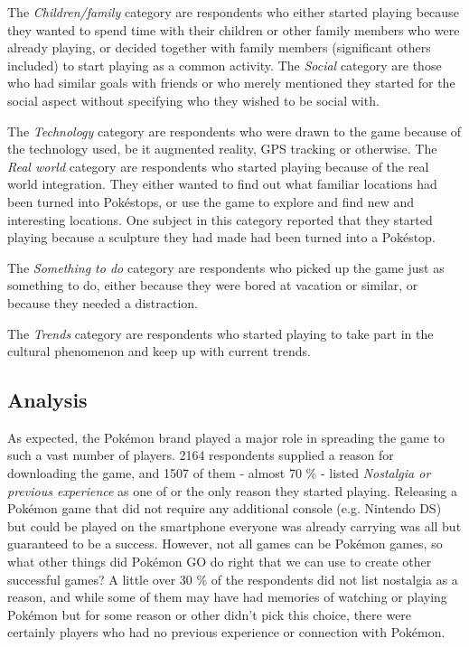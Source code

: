 The \emph{Children/family} category are respondents who either started playing because they wanted to spend time with their children or other family members who were already playing, or decided together with family members (significant others included) to start playing as a common activity. The \emph{Social} category are those who had similar goals with friends or who merely mentioned they started for the social aspect without specifying who they wished to be social with.

The \emph{Technology} category are respondents who were drawn to the game because of the technology used, be it augmented reality, GPS tracking or otherwise. The \emph{Real world} category are respondents who started playing because of the real world integration. They either wanted to find out what familiar locations had been turned into Pokéstops, or use the game to explore and find new and interesting locations. One subject in this category reported that they started playing because a sculpture they had made had been turned into a Pokéstop.

The \emph{Something to do} category are respondents who picked up the game just as something to do, either because they were bored at vacation or similar, or because they needed a distraction.

The \emph{Trends} category are respondents who started playing to take part in the cultural phenomenon and keep up with current trends.


\subsection{Analysis}

As expected, the Pokémon brand played a major role in spreading the game to such a vast number of players. 2164 respondents supplied a reason for downloading the game, and 1507 of them - almost 70 \% - listed \emph{Nostalgia or previous experience} as one of or the only reason they started playing. Releasing a Pokémon game that did not require any additional console (e.g. Nintendo DS) but could be played on the smartphone everyone was already carrying was all but guaranteed to be a success. However, not all games can be Pokémon games, so what other things did Pokémon GO do right that we can use to create other successful games? A little over 30 \% of the respondents did not list nostalgia as a reason, and while some of them may have had memories of watching or playing Pokémon but for some reason or other didn't pick this choice, there were certainly players who had no previous experience or connection with Pokémon.

